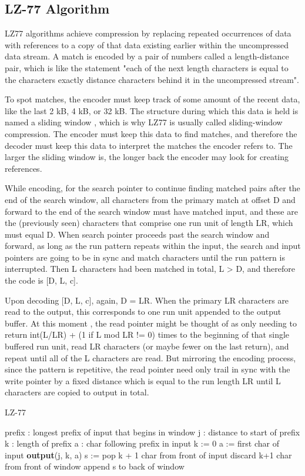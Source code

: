 \documentclass{article}
\begin{document}
\subsection{LZ-77 Algorithm}
LZ77 algorithms achieve compression by replacing repeated occurrences of data with references to a copy of that data existing earlier within the uncompressed data stream. A match is encoded by a pair of numbers called a length-distance pair, which is like the statement "each of the next length characters is equal to the characters exactly distance characters behind it in the uncompressed stream".

To spot matches, the encoder must keep track of some amount of the recent data, like the last 2 kB, 4 kB, or 32 kB. The structure during which this data is held is named a sliding window , which is why LZ77 is usually called sliding-window compression. The encoder must keep this data to find matches, and therefore the decoder must keep this data to interpret the matches the encoder refers to. The larger the sliding window is, the longer back the encoder may look for creating references.

While encoding, for the search pointer to continue finding matched pairs after the end of the search window, all characters from the primary match at offset D and forward to the end of the search window must have matched input, and these are the (previously seen) characters that comprise one run unit of length LR, which must equal D. When search pointer proceeds past the search window and forward, as long as the run pattern repeats within the input, the search and input pointers are going to be in sync and match characters until the run pattern is interrupted. Then L characters had been matched in total, L > D, and therefore the code is [D, L, c].

Upon decoding [D, L, c], again, D = LR. When the primary LR characters are read to the output, this corresponds to one run unit appended to the output buffer. At this moment , the read pointer might be thought of as only needing to return int(L/LR) + (1 if L mod LR != 0) times to the beginning of that single buffered run unit, read LR characters (or maybe fewer on the last return), and repeat until all of the L characters are read. But mirroring the encoding process, since the pattern is repetitive, the read pointer need only trail in sync with the write pointer by a fixed distance which is equal to the run length LR until L characters are copied to output in total.

\begin{algorithm}
	\caption{LZ-77}
	\begin{algorithmic}[0]
		\STATE prefix : longest prefix of input that begins in window
		\STATE j : distance to start of prefix
		\STATE k : length of prefix
		\STATE a : char following prefix in input
		\STATE k := 0
		\STATE a := first char of input
		\ENDIF
		\ENDIF
		\STATE \textbf{output}(j, k, a)
		\STATE s := pop k + 1 char from front of input
		\STATE discard k+1 char from front of window
		\STATE append s to back of window
		\ENDWHILE
	\end{algorithmic}
\end{algorithm}
\end{document}
